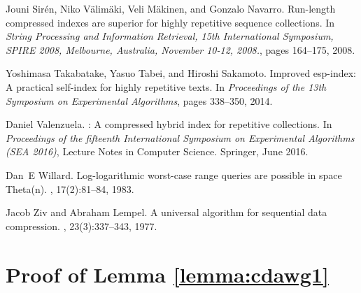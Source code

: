 \documentclass[a4paper,UKenglish]{lipics-v2016}
\begin{document}
\begin{thebibliography}{10}
Jouni Sir{\'{e}}n, Niko V{\"{a}}lim{\"{a}}ki, Veli M{\"{a}}kinen, and Gonzalo
  Navarro.
\newblock Run-length compressed indexes are superior for highly repetitive
  sequence collections.
\newblock In {\em String Processing and Information Retrieval, 15th
  International Symposium, {SPIRE} 2008, Melbourne, Australia, November 10-12,
  2008.}, pages 164--175, 2008.

Yoshimasa Takabatake, Yasuo Tabei, and Hiroshi Sakamoto.
\newblock Improved esp-index: {A} practical self-index for highly repetitive
  texts.
\newblock In {\em Proceedings of the 13th Symposium on Experimental
  Algorithms}, pages 338--350, 2014.

Daniel Valenzuela.
: A compressed hybrid index for repetitive collections.
\newblock In {\em Proceedings of the fifteenth International Symposium on
  Experimental Algorithms (SEA 2016)}, Lecture Notes in Computer Science.
  Springer, June 2016.

Dan~E Willard.
\newblock Log-logarithmic worst-case range queries are possible in space
  {Theta}(n).
, 17(2):81--84, 1983.

Jacob Ziv and Abraham Lempel.
\newblock A universal algorithm for sequential data compression.
, 23(3):337--343, 1977.

\end{thebibliography}





































\appendix


\section{Proof of Lemma \ref{lemma:cdawg1}} \label{appendix:cdawg1}
\end{document}
